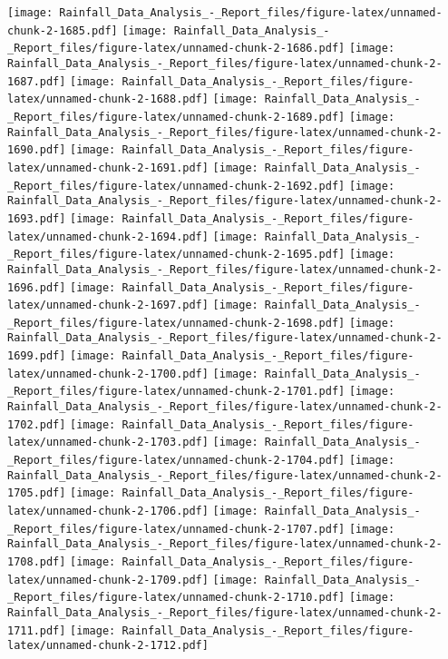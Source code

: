 \documentclass[
]{article}
\begin{document}
\texttt{[image: Rainfall\_Data\_Analysis\_-\_Report\_files/figure-latex/unnamed-chunk-2-1685.pdf]}
\texttt{[image: Rainfall\_Data\_Analysis\_-\_Report\_files/figure-latex/unnamed-chunk-2-1686.pdf]}
\texttt{[image: Rainfall\_Data\_Analysis\_-\_Report\_files/figure-latex/unnamed-chunk-2-1687.pdf]}
\texttt{[image: Rainfall\_Data\_Analysis\_-\_Report\_files/figure-latex/unnamed-chunk-2-1688.pdf]}
\texttt{[image: Rainfall\_Data\_Analysis\_-\_Report\_files/figure-latex/unnamed-chunk-2-1689.pdf]}
\texttt{[image: Rainfall\_Data\_Analysis\_-\_Report\_files/figure-latex/unnamed-chunk-2-1690.pdf]}
\texttt{[image: Rainfall\_Data\_Analysis\_-\_Report\_files/figure-latex/unnamed-chunk-2-1691.pdf]}
\texttt{[image: Rainfall\_Data\_Analysis\_-\_Report\_files/figure-latex/unnamed-chunk-2-1692.pdf]}
\texttt{[image: Rainfall\_Data\_Analysis\_-\_Report\_files/figure-latex/unnamed-chunk-2-1693.pdf]}
\texttt{[image: Rainfall\_Data\_Analysis\_-\_Report\_files/figure-latex/unnamed-chunk-2-1694.pdf]}
\texttt{[image: Rainfall\_Data\_Analysis\_-\_Report\_files/figure-latex/unnamed-chunk-2-1695.pdf]}
\texttt{[image: Rainfall\_Data\_Analysis\_-\_Report\_files/figure-latex/unnamed-chunk-2-1696.pdf]}
\texttt{[image: Rainfall\_Data\_Analysis\_-\_Report\_files/figure-latex/unnamed-chunk-2-1697.pdf]}
\texttt{[image: Rainfall\_Data\_Analysis\_-\_Report\_files/figure-latex/unnamed-chunk-2-1698.pdf]}
\texttt{[image: Rainfall\_Data\_Analysis\_-\_Report\_files/figure-latex/unnamed-chunk-2-1699.pdf]}
\texttt{[image: Rainfall\_Data\_Analysis\_-\_Report\_files/figure-latex/unnamed-chunk-2-1700.pdf]}
\texttt{[image: Rainfall\_Data\_Analysis\_-\_Report\_files/figure-latex/unnamed-chunk-2-1701.pdf]}
\texttt{[image: Rainfall\_Data\_Analysis\_-\_Report\_files/figure-latex/unnamed-chunk-2-1702.pdf]}
\texttt{[image: Rainfall\_Data\_Analysis\_-\_Report\_files/figure-latex/unnamed-chunk-2-1703.pdf]}
\texttt{[image: Rainfall\_Data\_Analysis\_-\_Report\_files/figure-latex/unnamed-chunk-2-1704.pdf]}
\texttt{[image: Rainfall\_Data\_Analysis\_-\_Report\_files/figure-latex/unnamed-chunk-2-1705.pdf]}
\texttt{[image: Rainfall\_Data\_Analysis\_-\_Report\_files/figure-latex/unnamed-chunk-2-1706.pdf]}
\texttt{[image: Rainfall\_Data\_Analysis\_-\_Report\_files/figure-latex/unnamed-chunk-2-1707.pdf]}
\texttt{[image: Rainfall\_Data\_Analysis\_-\_Report\_files/figure-latex/unnamed-chunk-2-1708.pdf]}
\texttt{[image: Rainfall\_Data\_Analysis\_-\_Report\_files/figure-latex/unnamed-chunk-2-1709.pdf]}
\texttt{[image: Rainfall\_Data\_Analysis\_-\_Report\_files/figure-latex/unnamed-chunk-2-1710.pdf]}
\texttt{[image: Rainfall\_Data\_Analysis\_-\_Report\_files/figure-latex/unnamed-chunk-2-1711.pdf]}
\texttt{[image: Rainfall\_Data\_Analysis\_-\_Report\_files/figure-latex/unnamed-chunk-2-1712.pdf]}
\end{document}
